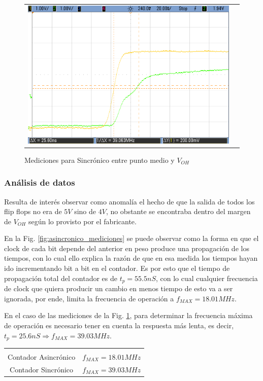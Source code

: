 \begin{figure}[H]
\begin{tabular}{c c}
            \includegraphics[scale=0.2]{../EJ7/Mediciones/Osciloscopio/Segundo_Intento/Sincronico/cropped_salida_q2.png}
        \end{tabular}
    \caption{Mediciones para Sincr\'onico entre punto medio y $V_{OH}$}
    \label{fig:sincronico_mediciones}
\end{figure}

\subsubsection{An\'alisis de datos}
Resulta de inter\'es observar como anomal\'ia el hecho de que la salida de todos los flip flops no era de $5 V$ sino de $4 V$,
no obstante se encontraba dentro del margen de $V_{OH}$ seg\'un lo provisto por el fabricante. 

En la Fig. \ref{fig:asincronico_mediciones} se puede observar como la forma en que el clock de cada bit depende del anterior en peso produce una propagaci\'on de los tiempos, con lo cual ello explica
la raz\'on de que en esa medida los tiempos hayan ido incrementando bit a bit en el contador. Es por esto que el tiempo de propagaci\'on total
del contador es de $t_p = 55.5nS$, con lo cual cualquier frecuencia de clock que quiera producir un cambio en menos tiempo de esto va a ser ignorada, por ende, limita la frecuencia de operaci\'on a
$f_{MAX} = 18.01MHz$.

En el caso de las mediciones de la Fig. \ref{fig:sincronico_mediciones}, para determinar la frecuencia
m\'axima de operaci\'on es necesario tener en cuenta la respuesta m\'as lenta, es decir, $t_p = 25.6nS \Rightarrow f_{MAX} = 39.03MHz$.

\begin{table}[H]
    \centering
    \begin{tabular}{c c}
        \hline \\
        Contador Asincr\'onico & $f_{MAX} = 18.01MHz$ \\
        Contador Sincr\'onico & $f_{MAX} = 39.03MHz$ \\
        \hline
    \end{tabular}
\end{table}

